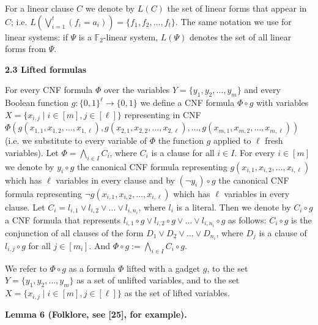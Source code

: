 For a linear clause $C$ we denote by $L(C)$ the set of linear forms that appear in $C$;
i.e. $L\left(\bigvee_{i=1}^{t}(f_{i}=a_{i})\right)=\{f_{1},f_{2},\dots,f_{t}\}$.
The same notation we use for linear systems: if $\Psi$ is a $\mathbb{F}_{2}$-linear system,
$L(\Psi)$ denotes the set of all linear forms from $\Psi$.\par


\par\medskip\noindent\textbf{
2.3 Lifted formulas}\par


For every CNF formula $\Phi$ over the variables $Y=\{y_{1},y_{2},\dots,y_{m}\}$ and every
Boolean function $g\colon\{0,1\}^{\ell}\to\{0,1\}$ we define a CNF formula
$\Phi\circ g$ with variables
$X=\{x_{i,j}\mid i\in[m],j\in[\ell]\}$ representing in CNF
$\Phi(g(x_{1,1},x_{1,2},\dots,x_{1,\ell}),g(x_{2,1},x_{2,2},\dots,x_{2,\ell}),\dots,g(x_{m,1},x_{m,2},\dots,x_{m,\ell}))$
(i.e. we substitute to every variable of $\Phi$ the function $g$ applied to $\ell$ fresh variables).
Let $\Phi=\bigwedge\limits_{i\in I}C_{i}$, where $C_{i}$ is a clause for all $i\in I$.
For every $i\in[m]$ we denote by $y_{i}\circ g$ the canonical CNF formula representing
$g(x_{i,1},x_{i,2},\dots,x_{i,\ell})$ which has $\ell$ variables in every clause and by
$(\lnot y_{i})\circ g$ the canonical CNF formula representing $\lnot g(x_{i,1},x_{i,2},\dots,x_{i,\ell})$
which has $\ell$ variables in every clause.
Let $C_{i}=l_{i,1}\lor l_{i,2}\lor\dots\lor l_{i,n_{i}}$, where $l_{i}$
is a literal. Then we denote by $C_{i}\circ g$ a CNF formula that represents $l_{i,1}\circ g\lor l_{i,2}\circ g\lor\dots\lor l_{i,n_{i}}\circ g$ as follows: $C_{i}\circ g$ is the conjunction of all clauses of the form $D_{1}\lor D_{2}\lor\dots\lor D_{n_{i}}$, where $D_{j}$ is a clause of $l_{i,j}\circ g$ for all $j\in[m_{i}]$.
And $\Phi\circ g:=\bigwedge\limits_{i\in I}C_{i}\circ g$.\par



We refer to $\Phi\circ g$ as a formula $\Phi$ lifted with a gadget $g$,
to the set $Y=\{y_{1},y_{2},\dots,y_{m}\}$ as a set of unlifted variables,
and to the set $X=\{x_{i,j}\mid i\in[m],j\in[\ell]\}$ as the set of lifted variables.\par



\par\medskip\noindent\textbf{
Lemma 6 (Folklore, see [25], for example).
}\par



